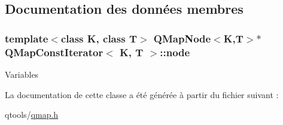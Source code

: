 \subsection{Documentation des données membres}
\hypertarget{class_q_map_const_iterator_a8f46f6a6172b01945bae3ca296e3f156}{}
\subsubsection[{node}]{\setlength{\rightskip}{0pt plus 5cm}template$<$class K, class T$>$ {\bf Q\+Map\+Node}$<$K,T$>$$\ast$ {\bf Q\+Map\+Const\+Iterator}$<$ K, T $>$\+::node}\label{class_q_map_const_iterator_a8f46f6a6172b01945bae3ca296e3f156}
Variables 

La documentation de cette classe a été générée à partir du fichier suivant \+:\begin{DoxyCompactItemize}
\item 
qtools/\hyperlink{qmap_8h}{qmap.\+h}\end{DoxyCompactItemize}
